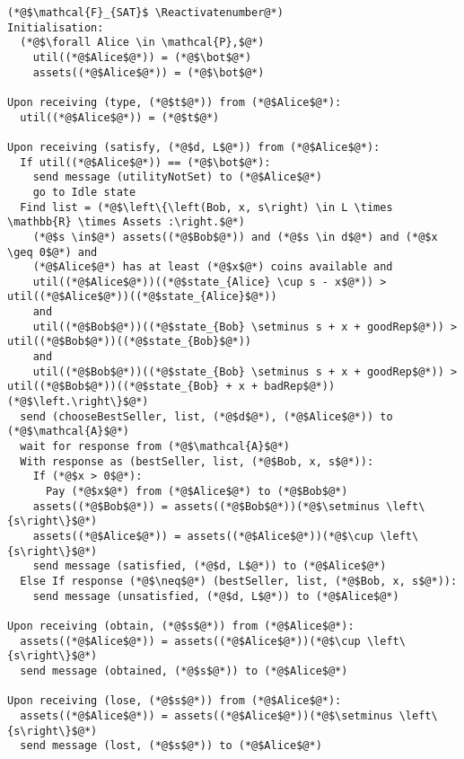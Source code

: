 \Suppressnumber
\begin{lstlisting}[label=satfunc, style=numbers]
(*@$\mathcal{F}_{SAT}$ \Reactivatenumber@*)
Initialisation:
  (*@$\forall Alice \in \mathcal{P},$@*)
    util((*@$Alice$@*)) = (*@$\bot$@*)
    assets((*@$Alice$@*)) = (*@$\bot$@*)

Upon receiving (type, (*@$t$@*)) from (*@$Alice$@*):
  util((*@$Alice$@*)) = (*@$t$@*)

Upon receiving (satisfy, (*@$d, L$@*)) from (*@$Alice$@*):
  If util((*@$Alice$@*)) == (*@$\bot$@*):
    send message (utilityNotSet) to (*@$Alice$@*)
    go to Idle state
  Find list = (*@$\left\{\left(Bob, x, s\right) \in L \times \mathbb{R} \times Assets :\right.$@*)
    (*@$s \in$@*) assets((*@$Bob$@*)) and (*@$s \in d$@*) and (*@$x \geq 0$@*) and
    (*@$Alice$@*) has at least (*@$x$@*) coins available and
    util((*@$Alice$@*))((*@$state_{Alice} \cup s - x$@*)) > util((*@$Alice$@*))((*@$state_{Alice}$@*))
    and
    util((*@$Bob$@*))((*@$state_{Bob} \setminus s + x + goodRep$@*)) > util((*@$Bob$@*))((*@$state_{Bob}$@*))
    and
    util((*@$Bob$@*))((*@$state_{Bob} \setminus s + x + goodRep$@*)) > util((*@$Bob$@*))((*@$state_{Bob} + x + badRep$@*))(*@$\left.\right\}$@*)
  send (chooseBestSeller, list, (*@$d$@*), (*@$Alice$@*)) to (*@$\mathcal{A}$@*)
  wait for response from (*@$\mathcal{A}$@*)
  With response as (bestSeller, list, (*@$Bob, x, s$@*)):
    If (*@$x > 0$@*):
      Pay (*@$x$@*) from (*@$Alice$@*) to (*@$Bob$@*)
    assets((*@$Bob$@*)) = assets((*@$Bob$@*))(*@$\setminus \left\{s\right\}$@*)
    assets((*@$Alice$@*)) = assets((*@$Alice$@*))(*@$\cup \left\{s\right\}$@*)
    send message (satisfied, (*@$d, L$@*)) to (*@$Alice$@*)
  Else If response (*@$\neq$@*) (bestSeller, list, (*@$Bob, x, s$@*)):
    send message (unsatisfied, (*@$d, L$@*)) to (*@$Alice$@*)

Upon receiving (obtain, (*@$s$@*)) from (*@$Alice$@*):
  assets((*@$Alice$@*)) = assets((*@$Alice$@*))(*@$\cup \left\{s\right\}$@*)
  send message (obtained, (*@$s$@*)) to (*@$Alice$@*)

Upon receiving (lose, (*@$s$@*)) from (*@$Alice$@*):
  assets((*@$Alice$@*)) = assets((*@$Alice$@*))(*@$\setminus \left\{s\right\}$@*)
  send message (lost, (*@$s$@*)) to (*@$Alice$@*)
\end{lstlisting}
